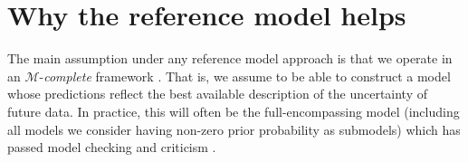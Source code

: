 \documentclass[american,]{article}
\theoremstyle{definition}
\begin{document}



\hypertarget{reference-model-approach}{%
\section{Why the reference model helps}\label{reference-model-approach}}

The main assumption under any reference model approach is that we
operate in an $\mathcal{M}$-\textit{complete} framework
\citep{book:bernardo_smith,vehtari2012survey}. That is, we assume to be able to construct a model whose predictions reflect the best available description of the uncertainty of future data. In practice, this will often be the full-encompassing model
(including all models we consider having non-zero prior
probability as submodels) which has passed model checking and criticism \citep[see,
e.g.][]{gelman2013bayesian}. 
 
\end{document}
